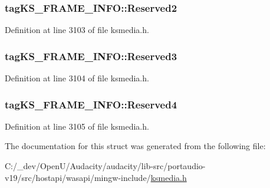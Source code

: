 \subsubsection[{\texorpdfstring{Reserved2}{Reserved2}}]{ tag\+K\+S\+\_\+\+F\+R\+A\+M\+E\+\_\+\+I\+N\+F\+O\+::\+Reserved2}\hypertarget{structtag_k_s___f_r_a_m_e___i_n_f_o_a5f1349ad5047b60bf95c0829e23dc50b}{}\label{structtag_k_s___f_r_a_m_e___i_n_f_o_a5f1349ad5047b60bf95c0829e23dc50b}


Definition at line 3103 of file ksmedia.\+h.

\subsubsection[{\texorpdfstring{Reserved3}{Reserved3}}]{ tag\+K\+S\+\_\+\+F\+R\+A\+M\+E\+\_\+\+I\+N\+F\+O\+::\+Reserved3}\hypertarget{structtag_k_s___f_r_a_m_e___i_n_f_o_aa3533daedcbecc9790f8a6df121c203d}{}\label{structtag_k_s___f_r_a_m_e___i_n_f_o_aa3533daedcbecc9790f8a6df121c203d}


Definition at line 3104 of file ksmedia.\+h.

\subsubsection[{\texorpdfstring{Reserved4}{Reserved4}}]{ tag\+K\+S\+\_\+\+F\+R\+A\+M\+E\+\_\+\+I\+N\+F\+O\+::\+Reserved4}\hypertarget{structtag_k_s___f_r_a_m_e___i_n_f_o_a8c5710fb97000b6c74781fec6e18fe4c}{}\label{structtag_k_s___f_r_a_m_e___i_n_f_o_a8c5710fb97000b6c74781fec6e18fe4c}


Definition at line 3105 of file ksmedia.\+h.



The documentation for this struct was generated from the following file\+:\begin{DoxyCompactItemize}
\item 
C\+:/\+\_\+dev/\+Open\+U/\+Audacity/audacity/lib-\/src/portaudio-\/v19/src/hostapi/wasapi/mingw-\/include/\hyperlink{ksmedia_8h}{ksmedia.\+h}\end{DoxyCompactItemize}
